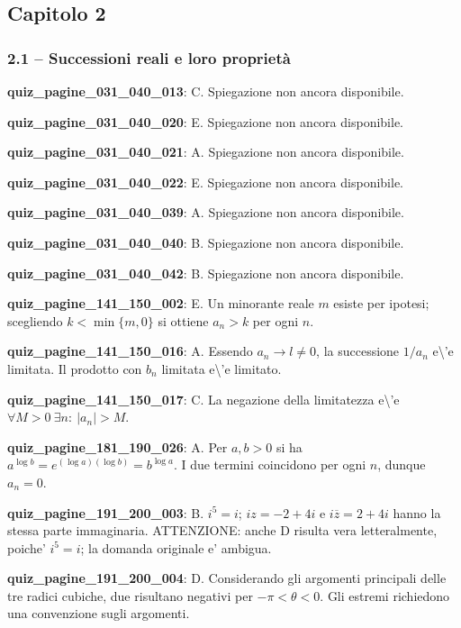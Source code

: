 \documentclass[11pt,a4paper]{article}
\newcounter{quiz}
\begin{document}
\subsection*{Capitolo 2}
\subsubsection*{2.1 -- Successioni reali e loro proprietà}
\noindent\textbf{quiz\_pagine\_031\_040\_013}: C. Spiegazione non ancora disponibile.\par\medskip
\noindent\textbf{quiz\_pagine\_031\_040\_020}: E. Spiegazione non ancora disponibile.\par\medskip
\noindent\textbf{quiz\_pagine\_031\_040\_021}: A. Spiegazione non ancora disponibile.\par\medskip
\noindent\textbf{quiz\_pagine\_031\_040\_022}: E. Spiegazione non ancora disponibile.\par\medskip
\noindent\textbf{quiz\_pagine\_031\_040\_039}: A. Spiegazione non ancora disponibile.\par\medskip
\noindent\textbf{quiz\_pagine\_031\_040\_040}: B. Spiegazione non ancora disponibile.\par\medskip
\noindent\textbf{quiz\_pagine\_031\_040\_042}: B. Spiegazione non ancora disponibile.\par\medskip
\noindent\textbf{quiz\_pagine\_141\_150\_002}: E. Un minorante reale $m$ esiste per ipotesi; scegliendo $k<\min\{m,0\}$ si ottiene $a_n>k$ per ogni $n$.\par\medskip
\noindent\textbf{quiz\_pagine\_141\_150\_016}: A. Essendo $a_n\to l\neq0$, la successione $1/a_n$ e\textbackslash{}'e limitata. Il prodotto con $b_n$ limitata e\textbackslash{}'e limitato.\par\medskip
\noindent\textbf{quiz\_pagine\_141\_150\_017}: C. La negazione della limitatezza e\textbackslash{}'e $\forall M>0\ \exists n:\ |a_n|>M$.\par\medskip
\noindent\textbf{quiz\_pagine\_181\_190\_026}: A. Per $a,b>0$ si ha $a^{\log b}=e^{(\log a)(\log b)}=b^{\log a}$. I due termini coincidono per ogni $n$, dunque $a_n=0$.\par\medskip
\noindent\textbf{quiz\_pagine\_191\_200\_003}: B. $i^5=i$; $iz=-2+4i$ e $i\overline z=2+4i$ hanno la stessa parte immaginaria. ATTENZIONE: anche D risulta vera letteralmente, poiche' $i^5=i$; la domanda originale e' ambigua.\par\medskip
\noindent\textbf{quiz\_pagine\_191\_200\_004}: D. Considerando gli argomenti principali delle tre radici cubiche, due risultano negativi per $-\pi<\theta<0$. Gli estremi richiedono una convenzione sugli argomenti.\par\medskip
\end{document}
